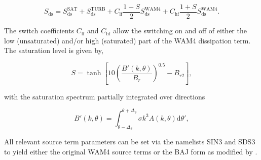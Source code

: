 \begin{equation}
 S_{\mathrm{ds}} =S_{\mathrm{ds}}^{\mathrm{SAT}}+S_{\mathrm{ds}}^{\mathrm{TURB}} +
C_{\mathrm{lf}} \frac{1-S}{2} S_{\mathrm{ds}}^{\mathrm{WAM4}}+
C_{\mathrm{hf}} \frac{1+S}{2} S_{\mathrm{ds}}^{\mathrm{WAM4}}.
\end{equation}

\noindent
The switch coefficients $C_{\mathrm{lf}}$ and $C_{\mathrm{hf}}$ allow the
switching on and off of either the low (unsaturated) and/or high (saturated)
part of the WAM4 dissipation term. The saturation level is given by,

\begin{equation}
S=\tanh\left[10
\left(\frac{B'\left(k,\theta\right)}{B_r}\right)^{0.5}-B_{r2}\right] ,
\end{equation}

\noindent
with the saturation spectrum partially integrated over directions

\begin{equation}
B'\left(k,\theta \right)=\int_{\theta-\Delta_\theta}^{\theta+\Delta_\theta}
\sigma k^3 A(k,\theta) \mathrm d \theta' \label{eq:defBofk},
\end{equation}

\noindent
All relevant source term parameters can be set via the namelists SIN3 and SDS3
to yield either the original WAM4 source terms or the BAJ form as modified by
\cite{rep:Bea05}.

